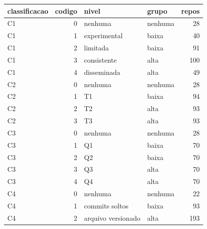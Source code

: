 \begin{tabular}{lrllr}
\toprule
classificacao & codigo & nivel & grupo & repos \\
\midrule
C1 & 0 & nenhuma & nenhuma & 28 \\
C1 & 1 & experimental & baixa & 40 \\
C1 & 2 & limitada & baixa & 91 \\
C1 & 3 & consistente & alta & 100 \\
C1 & 4 & disseminada & alta & 49 \\
C2 & 0 & nenhuma & nenhuma & 28 \\
C2 & 1 & T1 & baixa & 94 \\
C2 & 2 & T2 & alta & 93 \\
C2 & 3 & T3 & alta & 93 \\
C3 & 0 & nenhuma & nenhuma & 28 \\
C3 & 1 & Q1 & baixa & 70 \\
C3 & 2 & Q2 & baixa & 70 \\
C3 & 3 & Q3 & alta & 70 \\
C3 & 4 & Q4 & alta & 70 \\
C4 & 0 & nenhuma & nenhuma & 22 \\
C4 & 1 & commits soltos & baixa & 93 \\
C4 & 2 & arquivo versionado & alta & 193 \\
\bottomrule
\end{tabular}
